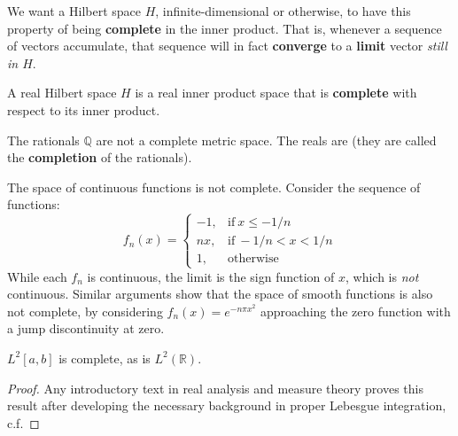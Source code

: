 	We want a Hilbert space $H$, infinite-dimensional or otherwise, to have this property of being \textbf{complete} in the inner product. That is, whenever a sequence of vectors accumulate, that sequence will in fact \textbf{converge} to a \textbf{limit} vector \emph{still in $H$}.
	
	\begin{defn}
		A real Hilbert space $H$ is a real inner product space that is \textbf{complete} with respect to its inner product. 
	\end{defn}
	\begin{example}
		The rationals $\mathbb Q$ are not a complete metric space. The reals are (they are called the \textbf{completion} of the rationals). 
	\end{example}
	\begin{example}
		The space of continuous functions is not complete. Consider the sequence of functions:
		\begin{equation}
			f_n(x) = \begin{cases}
    -1 ,& \mathrm{if} ~ x \leq  -1/n \\
    n x,  &\mathrm{if} ~ -1/n < x < 1/n \\
	1, & \mathrm{otherwise}
\end{cases}
		\end{equation}
		While each $f_n$ is continuous, the limit is the sign function of $x$, which is \emph{not} continuous. Similar arguments show that the space of smooth functions is also not complete, by considering $f_n (x) = e^{-n \pi x^2}$ approaching the zero function with a jump discontinuity at zero. 
	\end{example}
	
	
	\begin{theorem}
		$L^2[a,b]$ is complete, as is $L^2(\mathbb R)$.
	\end{theorem}
	\begin{proof}
		Any introductory text in real analysis and measure theory proves this result after developing the necessary background in proper Lebesgue integration, c.f. 
	\end{proof}
	

